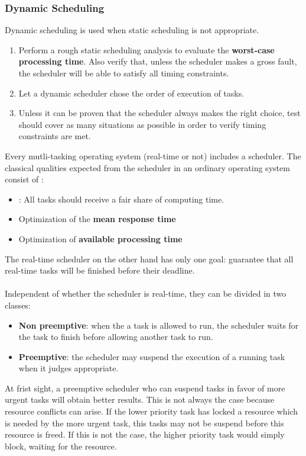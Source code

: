 \subsubsection{Dynamic Scheduling}
Dynamic scheduling is used when static scheduling is not appropriate. 
\begin{enumerate}
	\item Perform a rough static scheduling analysis to evaluate the \textbf{worst-case processing time}. Also verify that, unless the scheduler makes a gross fault, the scheduler will be able to satisfy all timing constraints. 
	\item Let a dynamic scheduler chose the order of execution of tasks.
	\item Unless it can be proven that the scheduler always makes the right choice, test should cover as many situations as possible in order to verify timing constraints are met.
\end{enumerate}

Every mutli-tasking operating system (real-time or not) includes a scheduler. The classical qualities expected from the scheduler in an ordinary operating system consist of :
\begin{itemize}
	\item {}: All tasks should receive a fair share of computing time.
	\item Optimization of the \textbf{mean response time} 
	\item Optimization of \textbf{available processing time} 
\end{itemize}
The real-time scheduler on the other hand has only one goal: guarantee that all real-time tasks will be finished before their deadline. 
\\\\
Independent of whether the scheduler is real-time, they can be divided in two classes:
\begin{itemize}
	\item \textbf{Non preemptive}: when the a task is allowed to run, the scheduler waits for the task to finish before allowing another task to run.
	\item \textbf{Preemptive}: the scheduler may suspend the execution of a running task when it judges appropriate.  
\end{itemize}

\begin{blockquote}
At frist sight, a preemptive scheduler who can suspend tasks in favor of more urgent tasks will obtain better results. This is not always the case because resource conflicts can arise. If  the lower priority task has locked a resource which is needed by the more urgent task, this tasks may not be suspend before this resource is freed. If this is not the case, the higher priority task would simply block, waiting for the resource.
\end{blockquote}

